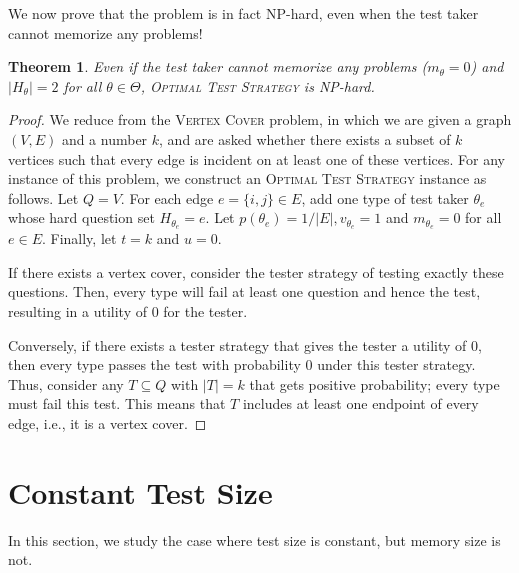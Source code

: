 \documentclass{article}
\newtheorem{theorem}{Theorem}
\begin{document}
We now prove that the problem is in fact NP-hard, even when the test taker
cannot memorize any problems!

\begin{theorem}\label{thm:test-hardness}
Even if the test taker cannot memorize any problems ($m_\theta = 0$) and $|H_\theta| = 2$ for all
$\theta \in \Theta$,
\textsc{Optimal
Test Strategy} is NP-hard.%
\end{theorem}
\begin{proof}
We reduce from the 
\textsc{Vertex Cover} problem, in which we are given a graph $(V,E)$ and a
number $k$, and are asked whether there exists a subset of $k$ vertices such
that every edge is incident on at least one of these vertices.
For any instance of this problem, we construct an \textsc{Optimal Test
	Strategy} instance as follows.
      Let $Q=V$.  For each edge $e = \{i, j\} \in E$, add one type of test
      taker $\theta_e$ whose hard question set $H_{\theta_e} = e$.  Let
      $p(\theta_e) = 1/|E|, v_{\theta_e} = 1$ and $m_{\theta_e} = 0$ for
      all $e \in E$.  Finally, let $t=k$ and $u = 0$.

If there exists a vertex cover, consider the tester strategy of testing
exactly these questions.  Then, every type will fail at least one question
and hence the test, resulting
in a utility of $0$ for the tester.

Conversely, if there exists a tester strategy that gives the tester a
utility of $0$, then every type passes the test with probability $0$ under
this tester strategy.  Thus, consider any $T \subseteq Q$ with $|T| = k$ that
gets positive probability; every type must fail this test.  This means that
$T$ includes at least one endpoint of every edge, i.e., it is a vertex cover.
\end{proof}

\section{Constant Test Size}

In this section, we study the case where test size is constant, but memory
size is not.
\end{document}
